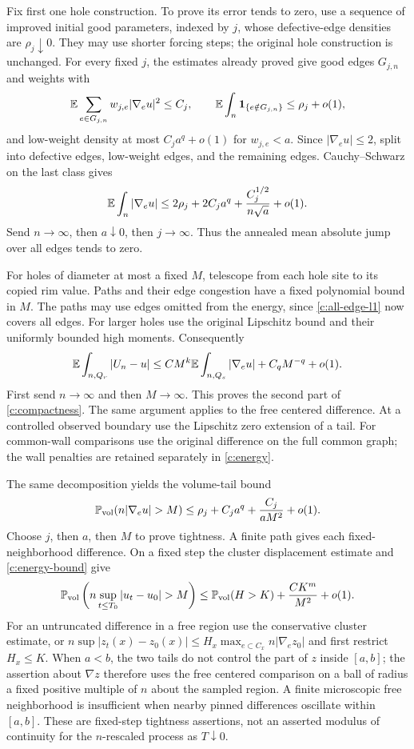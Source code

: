 Fix first one hole construction. To prove its error tends to zero,
use a sequence of improved initial good parameters, indexed by $j$,
whose defective-edge densities are $\rho_j\downarrow0$. They may
use shorter forcing steps; the original hole construction is unchanged.
For every fixed $j$, the estimates already proved give good edges
$G_{j,n}$ and weights with
\[
 \mathbb E\sum_{e\in G_{j,n}}w_{j,e}|\nabla_eu|^2\le C_j,\qquad
 \mathbb E\int_n\mathbf1_{\{e\notin G_{j,n}\}}\le\rho_j+o(1),
\]
and low-weight density at most $C_j a^q+o(1)$ for $w_{j,e}<a$.
Since $|\nabla_eu|\le2$, split into defective edges, low-weight
edges, and the remaining edges. Cauchy--Schwarz on the last class gives
\begin{equation}\label{c:all-edge-l1}
 \mathbb E\int_n|\nabla_eu|
 \le2\rho_j+2C_j a^q+\frac{C_j^{1/2}}{n\sqrt a}+o(1).
\end{equation}
Send $n\to\infty$, then $a\downarrow0$, then $j\to\infty$.
Thus the annealed mean absolute jump over all edges tends to zero.

For holes of diameter at most a fixed $M$, telescope from each hole
site to its copied rim value. Paths and their edge congestion have
a fixed polynomial bound in $M$. The paths may use edges omitted
from the energy, since \eqref{c:all-edge-l1} now covers all edges.
For larger holes use the original Lipschitz bound and their uniformly
bounded high moments. Consequently
\[
 \mathbb E\int_{n,Q_r}|U_n-u|
 \le C M^k\mathbb E\int_{n,Q_s}|\nabla_eu|+C_q M^{-q}+o(1).
\]
First send $n\to\infty$ and then $M\to\infty$. This proves the
second part of \eqref{c:compactness}. The same argument applies to
the free centered difference. At a controlled observed boundary use
the Lipschitz zero extension of a tail. For common-wall comparisons
use the original difference on the full common graph; the wall
penalties are retained separately in \eqref{c:energy}.

The same decomposition yields the volume-tail bound
\[
 \Prob_{\rm vol}(n|\nabla_eu|>M)
 \le\rho_j+C_j a^q+\frac{C_j}{aM^2}+o(1).
\]
Choose $j$, then $a$, then $M$ to prove tightness. A finite path
gives each fixed-neighborhood difference. On a fixed step the
cluster displacement estimate and \eqref{c:energy-bound} give
\[
 \Prob_{\rm vol}\left(n\sup_{t\le T_0}|u_t-u_0|>M\right)
 \le\Prob_{\rm vol}(H>K)+\frac{C K^m}{M^2}+o(1).
\]
For an untruncated difference in a free region use the conservative
cluster estimate, or
$n\sup|z_t(x)-z_0(x)|\le
H_x\max_{e\subset C_x}n|\nabla_ez_0|$ and first restrict $H_x\le K$.
When $a<b$, the two tails do not control the part of $z$ inside
$[a,b]$; the assertion about $\nabla z$ therefore uses the free
centered comparison on a ball of radius a fixed positive multiple
of $n$ about the sampled region. A finite microscopic free
neighborhood is insufficient when nearby pinned differences
oscillate within $[a,b]$.
These are fixed-step tightness assertions, not an asserted modulus
of continuity for the $n$-rescaled process as $T\downarrow0$.

